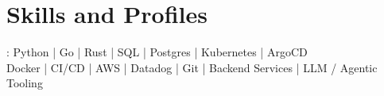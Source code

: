 \documentclass[print]{jack-resume}
\begin{document}
\pagecolor{darkmodeBackground}

%
%



%
%
\begin{minipage}[t][1cm][t]{.03\textwidth}
    \hfill
\end{minipage}






\section{Skills and Profiles}
:
Python \hfill | \hfill
Go \hfill | \hfill
Rust \hfill | \hfill
SQL \hfill | \hfill
Postgres \hfill | \hfill
Kubernetes \hfill | \hfill
ArgoCD \\
\hspace{1.0cm} Docker \hfill | \hfill
CI/CD \hfill | \hfill
AWS \hfill | \hfill
Datadog \hfill | \hfill
Git \hfill | \hfill
Backend Services \hfill | \hfill
LLM / Agentic Tooling \\
\end{document}
